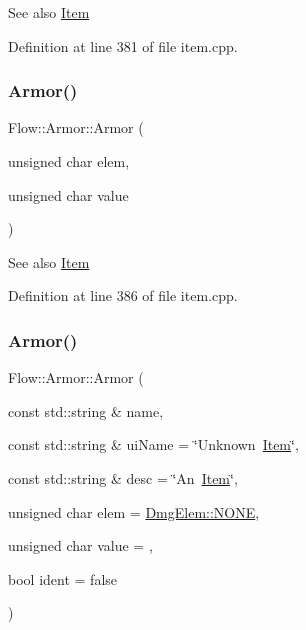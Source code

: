 \begin{DoxySeeAlso}{See also}
\hyperlink{class_flow_1_1_item}{Item} 
\end{DoxySeeAlso}


Definition at line 381 of file item.\+cpp.

\hypertarget{class_flow_1_1_armor_aa045afaeef733451f35b823b03f5ce49}{}\label{class_flow_1_1_armor_aa045afaeef733451f35b823b03f5ce49} 
\subsubsection{\texorpdfstring{Armor()}{Armor()}\hspace{0.1cm}{\footnotesize\ttfamily [3/4]}}
{\footnotesize\ttfamily Flow\+::\+Armor\+::\+Armor (\begin{DoxyParamCaption}\item[{unsigned char}]{elem,  }\item[{unsigned char}]{value }\end{DoxyParamCaption})}

\begin{DoxySeeAlso}{See also}
\hyperlink{class_flow_1_1_item}{Item} 
\end{DoxySeeAlso}


Definition at line 386 of file item.\+cpp.

\hypertarget{class_flow_1_1_armor_a0e292337b44478aebf7da35d8c27e814}{}\label{class_flow_1_1_armor_a0e292337b44478aebf7da35d8c27e814} 
\subsubsection{\texorpdfstring{Armor()}{Armor()}\hspace{0.1cm}{\footnotesize\ttfamily [4/4]}}
{\footnotesize\ttfamily Flow\+::\+Armor\+::\+Armor (\begin{DoxyParamCaption}\item[{const std\+::string \&}]{name,  }\item[{const std\+::string \&}]{ui\+Name = {\ttfamily \char`\"{}Unknown~\hyperlink{class_flow_1_1_item}{Item}\char`\"{}},  }\item[{const std\+::string \&}]{desc = {\ttfamily \char`\"{}An~\hyperlink{class_flow_1_1_item}{Item}\char`\"{}},  }\item[{unsigned char}]{elem = {\ttfamily \hyperlink{namespace_flow_1_1_dmg_elem_a2c7180f371963927ddcc5b333568a33b}{Dmg\+Elem\+::\+N\+O\+NE}},  }\item[{unsigned char}]{value = {},  }\item[{bool}]{ident = {\ttfamily false} }\end{DoxyParamCaption})}

